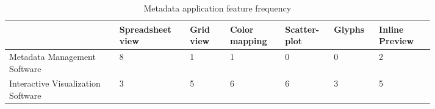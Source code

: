 \begin{table}[h]
\label{tab:ch04_app_freq}
	\centering
	\begin{tabularx}{\linewidth}{p{0.22\linewidth}||p{0.13\linewidth}|p{0.08\linewidth}|p{0.11\linewidth}|p{0.08\linewidth}|p{0.08\linewidth}|p{0.11\linewidth}}
		& Spreadsheet view & Grid view & Color mapping & Scatter-plot & Glyphs & Inline Preview\tabularnewline
		\toprule
		Metadata Management Software & 8 & 1 & 1 & 0 & 0 & 2\tabularnewline
		Interactive Visualization Software & 3 & 5 & 6 & 6 & 3 & 5\tabularnewline
	\bottomrule
	\end{tabularx}
	\caption[Metadata application feature frequency]{Metadata application feature frequency\footnotemark}
	\label{tab:appfeatfreq}
\end{table}
